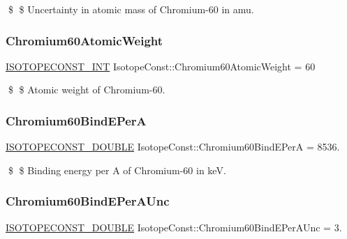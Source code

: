 \$ \$ Uncertainty in atomic mass of Chromium-\/60 in amu. \mbox{\label{group___isotope_const-_chromium-_cr60_gaf56c8cbd8b10eef0986cc1c771c1486a}} 
\subsubsection{\texorpdfstring{Chromium60\+Atomic\+Weight}{Chromium60AtomicWeight}}
{\footnotesize\ttfamily \mbox{\hyperlink{group___isotope_const-_macros_ga5f18360b3e99483a35c32d789e62621c}{I\+S\+O\+T\+O\+P\+E\+C\+O\+N\+S\+T\+\_\+\+I\+NT}} Isotope\+Const\+::\+Chromium60\+Atomic\+Weight = 60}

\$ \$ Atomic weight of Chromium-\/60. \mbox{\label{group___isotope_const-_chromium-_cr60_gaa2030ba0f9755ecfe04cbef4e548b2d0}} 
\subsubsection{\texorpdfstring{Chromium60\+Bind\+E\+PerA}{Chromium60BindEPerA}}
{\footnotesize\ttfamily \mbox{\hyperlink{group___isotope_const-_macros_ga8f45a7272ce02c0b4c65c44636ed719a}{I\+S\+O\+T\+O\+P\+E\+C\+O\+N\+S\+T\+\_\+\+D\+O\+U\+B\+LE}} Isotope\+Const\+::\+Chromium60\+Bind\+E\+PerA = 8536.}

\$ \$ Binding energy per A of Chromium-\/60 in keV. \mbox{\label{group___isotope_const-_chromium-_cr60_gaeb39bf1f6fc9d1cc24d50459d5c176d4}} 
\subsubsection{\texorpdfstring{Chromium60\+Bind\+E\+Per\+A\+Unc}{Chromium60BindEPerAUnc}}
{\footnotesize\ttfamily \mbox{\hyperlink{group___isotope_const-_macros_ga8f45a7272ce02c0b4c65c44636ed719a}{I\+S\+O\+T\+O\+P\+E\+C\+O\+N\+S\+T\+\_\+\+D\+O\+U\+B\+LE}} Isotope\+Const\+::\+Chromium60\+Bind\+E\+Per\+A\+Unc = 3.}

